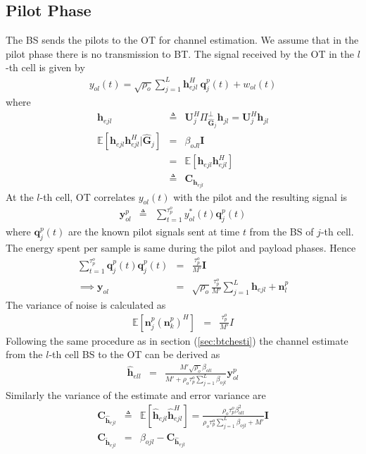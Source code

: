 \documentclass[10pt, a4paper, twoside,fleqn]{article}
\begin{document}
\subsection{Pilot Phase}
	The BS sends the pilots to the OT for channel estimation. We assume that in the pilot phase there is no transmission to BT.
The signal received by the OT in the $l$-th cell is given by
\begin{eqnarray}
	y_{ol}(t)=\sqrt{\rho_o} \sum_{j=1}^{L} \pmb{h}^H_{ejl} \ \pmb{q}^p_{j}(t) + w_{ol}(t) 
\end{eqnarray}
where
\begin{eqnarray}
	\pmb{h}_{ejl} &\triangleq& \pmb{U}_j^H\Pi^{\perp}_{{\hat{\pmb{G}}_j}}\pmb{h}_{jl} = \pmb{U}_j^H\pmb{h}_{jl} \nonumber \\
    \mathbb{E}[\pmb{h}_{ejl}\pmb{h}^H_{ejl}|\pmb{\hat G}_j] &=& \beta_{oJl}\pmb{I} \nonumber \\
			                     &=& \mathbb{E}[\pmb{h}_{ejl}\pmb{h}^H_{ejl}] \nonumber \\
                                           &\triangleq& \pmb{C}_{\pmb{h}_{ejl}} \nonumber
\end{eqnarray}
At the $l$-th cell, OT correlates $y_{ol}(t)$ with the pilot and the resulting signal is
\begin{eqnarray}
	\pmb{y}_{ol}^{p} &\triangleq& \sum_{t=1}^{\tau_p^o} y_{ol}^*(t)\pmb{q}^{p}_{j}(t) \nonumber
\end{eqnarray}
where $\pmb{q}_j^p(t)$ are the known pilot signals sent at time $t$ from the BS of $j$-th cell. The energy spent per sample is same during the pilot and payload phases. Hence 
\begin{eqnarray}
    \sum\limits_{t=1}^{\tau_p^o}\pmb{q}^p_{j}(t)\pmb{q}^p_{j}(t)&=&\frac{\tau_p^o}{M'}\pmb{I} \\
\implies \pmb{y}_{ol} &=& \sqrt{\rho_o}\frac{\tau_p^o}{M'}\sum_{j=1}^{L}\pmb{h}_{ejl}+\pmb{n}^p_{l}
\end{eqnarray}
The variance of noise is calculated as
\begin{eqnarray}
	\mathbb{E}[\pmb{n}^p_{j}(\pmb{n}^p_{k})^H] &=& \frac{\tau_p^o}{M'}I \nonumber
\end{eqnarray}
Following the same procedure as in section (\ref{sec:btchesti}) the channel estimate from the $l$-th cell BS to the OT can be derived as 
\begin{eqnarray}\label{eqn:otchesti}
	\pmb{\hat h}_{ell} &=& \frac{M'\sqrt{\rho_o}\beta_{oll}}{M'+\rho_o\tau_p^o\sum\limits_{j=1}^{L}\beta_{ojl}}\pmb{y}^p_{ol}
\end{eqnarray}
Similarly the variance of the estimate and error variance are
\begin{eqnarray}
	\pmb{C}_{\pmb{\hat h}_{ejl}} &\triangleq& \mathbb{E}[\pmb{\hat h}_{ejl}\pmb{\hat h}^H_{ejl}] = \frac{\rho_o\tau_p^o\beta^2_{oll}}{\rho_o\tau_p^o\sum\limits_{j=1}^{L}\beta_{ojl}+M'}\pmb{I} \\
	\pmb{C}_{\pmb{\widetilde{h}}_{ejl}} &=& \beta_{ojl} - 	\pmb{C}_{\pmb{\hat h}_{ejl}}
\end{eqnarray}
\end{document}
